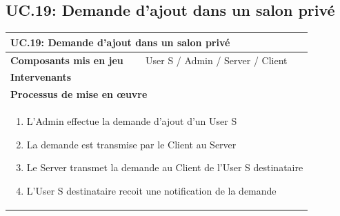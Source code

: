 \documentclass[a4paper,11pt,french]{article}
\begin{document}
\subsection{UC.19: Demande d’ajout dans un salon privé}
\begin{center}
	\vspace*{0.7cm}
	\begin{tabularx}{16cm}{|l|X|}
	\hline
	\multicolumn{2}{|l|}{\textbf{UC.19: Demande d’ajout dans un salon privé}}\\
	\hline
	\textbf{Composants mis en jeu} & User S / Admin / Server / Client  \\
	\hline
	\textbf{Intervenants} & \\
	\hline
	\multicolumn{2}{|l|}{\textbf{Processus de mise en \oe uvre}}\\
	\hline
	\multicolumn{2}{|p{15cm}|}{\begin{enumerate}\item L'Admin effectue la demande d'ajout d'un User S \item La demande est transmise par le Client au Server \item Le Server transmet la demande au Client de l'User S destinataire \item L'User S destinataire recoit une notification de la demande \end{enumerate}}\\
	\hline
	\end{tabularx}
\end{center}

\end{document}
